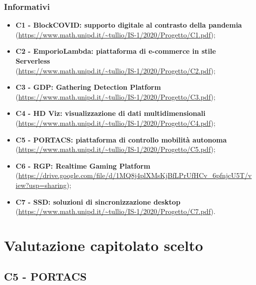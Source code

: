 \documentclass[]{article}
\begin{document}
			\subsubsection{Informativi}
			\begin{itemize}
				\item \textbf{ C1 - BlockCOVID: supporto digitale al contrasto della pandemia}\\
				(\url{https://www.math.unipd.it/~tullio/IS-1/2020/Progetto/C1.pdf});

				\item \textbf{ C2 - EmporioLambda: piattaforma di e-commerce in stile Serverless}\\
				(\url{https://www.math.unipd.it/\~tullio/IS-1/2020/Progetto/C2.pdf});

				\item \textbf{ C3 - GDP: Gathering Detection Platform}\\ (\url{https://www.math.unipd.it/~tullio/IS-1/2020/Progetto/C3.pdf});

				\item \textbf{ C4 - HD Viz: visualizzazione di dati multidimensionali}\\
				(\url{https://www.math.unipd.it/~tullio/IS-1/2020/Progetto/C4.pdf});

				\item \textbf{ C5 - PORTACS: piattaforma di controllo mobilità autonoma}\\
				(\url{https://www.math.unipd.it/~tullio/IS-1/2020/Progetto/C5.pdf});

				\item \textbf{ C6 - RGP: Realtime Gaming Platform}\\
				(\url{https://drive.google.com/file/d/1MQ8j4plXMsKjBfLPrUfHCv\_6pfnjcU5T/view?usp=sharing});

				\item \textbf{ C7 - SSD: soluzioni di sincronizzazione desktop}\\
				(\url{https://www.math.unipd.it/~tullio/IS-1/2020/Progetto/C7.pdf}).
			\end{itemize}

	\newpage

	\section{Valutazione capitolato scelto}
		\subsection{C5 - PORTACS}
\end{document}
